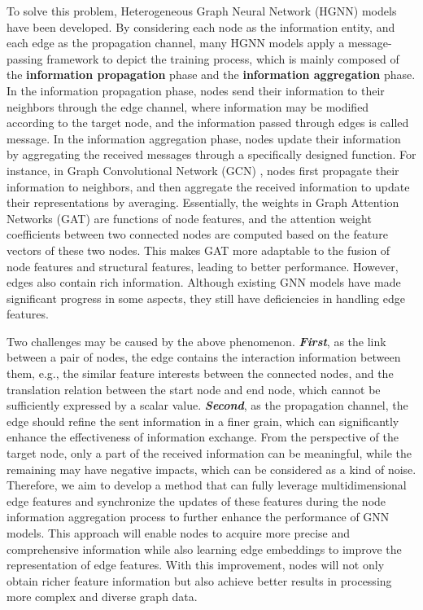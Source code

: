 To solve this problem, Heterogeneous Graph Neural Network (HGNN) \cite{shi2022heterogeneous, wang2019heterogeneous} models have been developed. 
%
By considering each node as the information entity, and each edge as the propagation channel, many HGNN models apply a message-passing framework \cite{xu2022explicit, ding2021diffmg} to depict the training process, which is mainly composed of the \textbf{information propagation} phase and the \textbf{information aggregation} phase. 
%
In the information propagation phase, nodes send their information to their neighbors through the edge channel, where information may be modified according to the target node, and the information passed through edges is called message. 
In the information aggregation phase, nodes update their information by aggregating the received messages through a specifically designed function.
%
For instance, in Graph Convolutional Network (GCN) \cite{kipf2016semi, yu2022multiplex}, nodes first propagate their information to neighbors, and then aggregate the received information to update their representations by averaging. 
%
Essentially, the weights in Graph Attention Networks (GAT) \cite{velivckovic2017graph} are functions of node features, and the attention weight coefficients between two connected nodes are computed based on the feature vectors of these two nodes. This makes GAT more adaptable to the fusion of node features and structural features, leading to better performance. However, edges also contain rich information. Although existing GNN models have made significant progress in some aspects, they still have deficiencies in handling edge features.

Two challenges may be caused by the above phenomenon.
\emph{\textbf{First}}, as the link between a pair of nodes, the edge contains the interaction information between them, e.g., the similar feature interests between the connected nodes, and the translation relation between the start node and end node, which cannot be sufficiently expressed by a scalar value.
\emph{\textbf{Second}}, as the propagation channel, the edge should refine the sent information in a finer grain, which can significantly enhance the effectiveness of information exchange. From the perspective of the target node, only a part of the received information can be meaningful, while the remaining may have negative impacts, which can be considered as a kind of noise.
Therefore, we aim to develop a method that can fully leverage multidimensional edge features and synchronize the updates of these features during the node information aggregation process to further enhance the performance of GNN models. 
This approach will enable nodes to acquire more precise and comprehensive information while also learning edge embeddings to improve the representation of edge features. 
With this improvement, nodes will not only obtain richer feature information but also achieve better results in processing more complex and diverse graph data.

